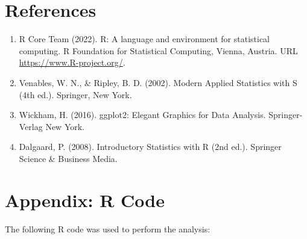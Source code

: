 \documentclass[a4paper,12pt]{article}
\begin{document}
\section*{References}
\label{sec:references}

\begin{enumerate}[leftmargin=1.5cm]
    \item R Core Team (2022). R: A language and environment for statistical computing. R Foundation for Statistical Computing, Vienna, Austria. URL \url{https://www.R-project.org/}.
    \item Venables, W. N., \& Ripley, B. D. (2002). Modern Applied Statistics with S (4th ed.). Springer, New York.
    \item Wickham, H. (2016). ggplot2: Elegant Graphics for Data Analysis. Springer-Verlag New York.
    \item Dalgaard, P. (2008). Introductory Statistics with R (2nd ed.). Springer Science \& Business Media.
\end{enumerate}

\section*{Appendix: R Code}
\label{sec:appendix}

The following R code was used to perform the analysis:
\end{document}
